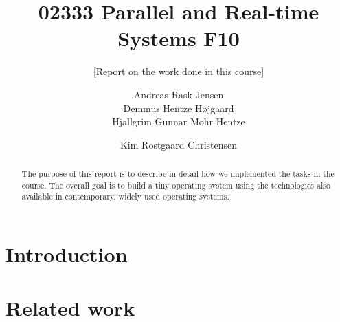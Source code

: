 \documentclass{acm_proc_article-sp}
\begin{document}
\title{02333 Parallel and Real-time Systems F10}
\subtitle{[Report on the work done in this course]
}

\author{
\alignauthor
Andreas Rask Jensen\\
\alignauthor
Demmus Hentze Højgaard\\
\alignauthor
Hjallgrim Gunnar Mohr Hentze\\
\and  %
\alignauthor 
Kim Rostgaard Christensen\\
}

\maketitle
\begin{abstract}
The purpose of this report is to describe in detail how we implemented the tasks in the course. The overall goal is to build a tiny operating system using the technologies also available in contemporary, widely used operating systems.
\end{abstract}






\section{Introduction}


\section{Related work}

\end{document}
